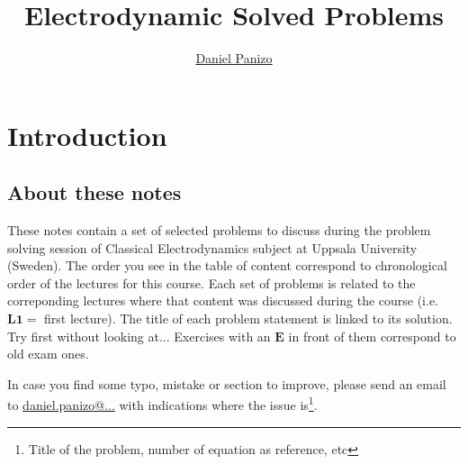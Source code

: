 \documentclass[a4paper,12pt]{article}
\numberwithin{equation}{subsection}
\begin{document}
\author{\hyperlink{daniel.panizo@physics.uu.se}{Daniel Panizo}} %
\title{Electrodynamic Solved Problems} %
\date{} %

\maketitle
\newpage
\setcounter{tocdepth}{2}
\tableofcontents
\newpage

\section{Introduction}
\subsection{About these notes}
These notes contain a set of selected problems to discuss during the problem solving session of Classical Electrodynamics subject at Uppsala University (Sweden). The order you see in the table of content correspond to chronological order of the lectures for this course. Each set of problems is related to the correponding lectures where that content was discussed during the course (i.e. $\mathbf{L 1} = $ first lecture). The title of each problem statement is linked to its solution. Try first without looking at...
Exercises with an $\mathbf{E}$ in front of them correspond to old exam ones.

In case you find some typo, mistake or section to improve, please send an email to \hyperlink{daniel.panizo@physics.uu.se}{daniel.panizo@...} with indications where the issue is\footnote{Title of the problem, number of equation as reference, etc}. 
\end{document}
